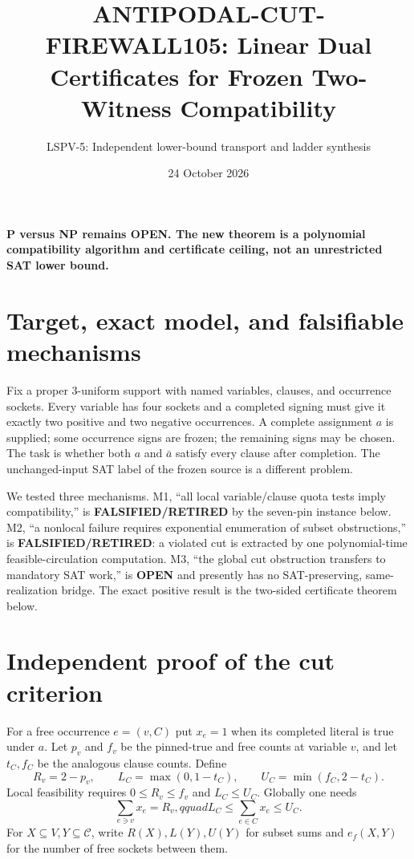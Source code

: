 \documentclass[11pt]{article}
\title{ANTIPODAL-CUT-FIREWALL105: Linear Dual Certificates for Frozen Two-Witness Compatibility}
\author{LSPV-5: Independent lower-bound transport and ladder synthesis}
\date{24 October 2026}
\newcommand{\OPEN}{\textbf{OPEN}}
\begin{document}
\maketitle
\begin{center}\textbf{P versus NP remains OPEN. The new theorem is a polynomial compatibility algorithm and certificate ceiling, not an unrestricted SAT lower bound.}\end{center}

\section{Target, exact model, and falsifiable mechanisms}
Fix a proper 3-uniform support with named variables, clauses, and occurrence sockets.  Every variable has four sockets and a completed signing must give it exactly two positive and two negative occurrences.  A complete assignment $a$ is supplied; some occurrence signs are frozen; the remaining signs may be chosen.  The task is whether both $a$ and $\bar a$ satisfy every clause after completion.  The unchanged-input SAT label of the frozen source is a different problem.

We tested three mechanisms.  M1, ``all local variable/clause quota tests imply compatibility,'' is \textbf{FALSIFIED/RETIRED} by the seven-pin instance below.  M2, ``a nonlocal failure requires exponential enumeration of subset obstructions,'' is \textbf{FALSIFIED/RETIRED}: a violated cut is extracted by one polynomial-time feasible-circulation computation.  M3, ``the global cut obstruction transfers to mandatory SAT work,'' is \OPEN{} and presently has no SAT-preserving, same-realization bridge.  The exact positive result is the two-sided certificate theorem below.

\section{Independent proof of the cut criterion}
For a free occurrence $e=(v,C)$ put $x_e=1$ when its completed literal is true under $a$.  Let $p_v$ and $f_v$ be the pinned-true and free counts at variable $v$, and let $t_C,f_C$ be the analogous clause counts.  Define
\[
R_v=2-p_v,\qquad L_C=\max(0,1-t_C),\qquad U_C=\min(f_C,2-t_C).
\]
Local feasibility requires $0\le R_v\le f_v$ and $L_C\le U_C$.  Globally one needs
\[
\sum_{e\ni v}x_e=R_v,qquad L_C\le\sum_{e\in C}x_e\le U_C. \tag{1}
\]
For $X\subseteq V,Y\subseteq\mathcal C$, write $R(X),L(Y),U(Y)$ for subset sums and $e_f(X,Y)$ for the number of free sockets between them.
\end{document}

